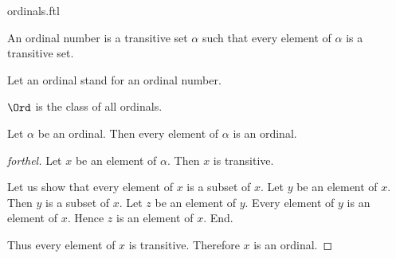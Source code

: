 \documentclass{naproche-library}
\begin{document}
\begin{smodule}[title=Ordinal Numbers]{ordinals.ftl}

\begin{definition}[forthel,id=SET_THEORY_02_229593678086144]
  An ordinal number is a transitive set $\alpha$ such that every element of $\alpha$ is a transitive set.

  Let an ordinal stand for an ordinal number.
\end{definition}

\begin{definition}[forthel,id=SET_THEORY_02_5852994258075648]
  $\Ord$ is the class of all ordinals.
\end{definition}

\begin{proposition}[forthel,id=SET_THEORY_02_2358097091756032]
  Let $\alpha$ be an ordinal.
  Then every element of $\alpha$ is an ordinal.
\end{proposition}
\begin{proof}[forthel]
  Let $x$ be an element of $\alpha$.
  Then $x$ is transitive.

  Let us show that every element of $x$ is a subset of $x$.
    Let $y$ be an element of $x$.
    Then $y$ is a subset of $x$.
    Let $z$ be an element of $y$.
    Every element of $y$ is an element of $x$.
    Hence $z$ is an element of $x$.
  End.

  Thus every element of $x$ is transitive.
  Therefore $x$ is an ordinal.
\end{proof}
\end{smodule}
\end{document}
